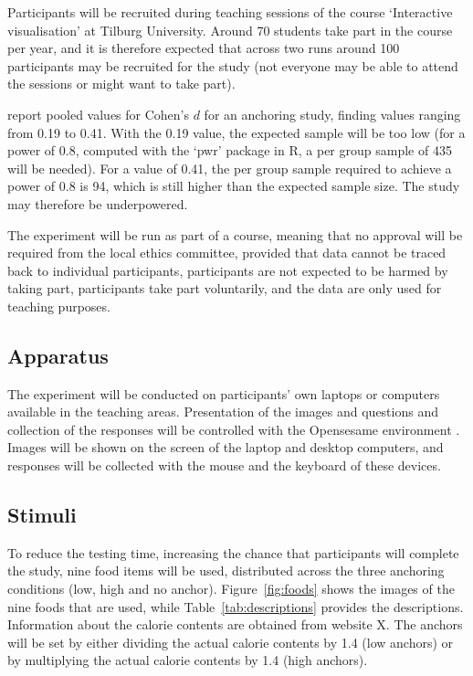 \documentclass[a4paper,doc,natbib]{apa6}
\begin{document}
    Participants will be recruited during teaching sessions of the course `Interactive visualisation' at Tilburg University. Around 70 students take part in the course per year, and it is therefore expected that across two runs around 100 participants may be recruited for the study (not everyone may be able to attend the sessions or might want to take part).

    \citet{shanks2020incidental} report pooled values for Cohen's $d$ for an anchoring study, finding values ranging from 0.19 to 0.41. With the 0.19 value, the expected sample will be too low (for a power of 0.8, computed with the `pwr' package in R, a per group sample of 435 will be needed). For a value of 0.41, the per group sample required to achieve a power of 0.8 is 94, which is still higher than the expected sample size. The study may therefore be underpowered.

    The experiment will be run as part of a course, meaning that no approval will be required from the local ethics committee, provided that data cannot be traced back to individual participants, participants are not expected to be harmed by taking part, participants take part voluntarily, and the data are only used for teaching purposes.

    \subsection{Apparatus}

    The experiment will be conducted on participants' own laptops or computers available in the teaching areas. Presentation of the images and questions and collection of the responses will be controlled with the Opensesame environment \citep{mathot2012opensesame}. Images will be shown on the screen of the laptop and desktop computers, and responses will be collected with the mouse and the keyboard of these devices.

    \subsection{Stimuli}

    To reduce the testing time, increasing the chance that participants will complete the study, nine food items will be used, distributed across the three anchoring conditions (low, high and no anchor). Figure~\ref{fig:foods} shows the images of the nine foods that are used, while Table~\ref{tab:descriptions} provides the descriptions. Information about the calorie contents are obtained from website X. The anchors will be set by either dividing the actual calorie contents by 1.4 (low anchors) or by multiplying the actual calorie contents by 1.4 (high anchors).
\end{document}
